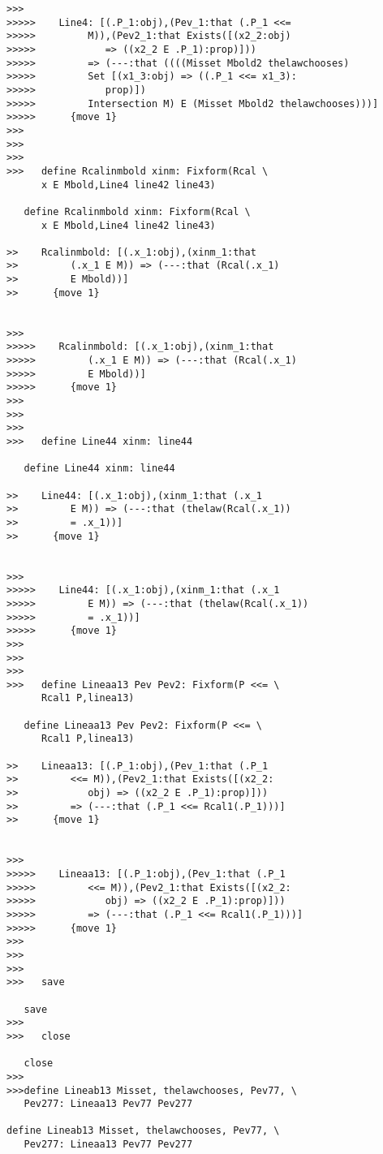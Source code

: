 \documentclass[12pt]{article}
\begin{document}
\begin{verbatim}
>>>
>>>>>    Line4: [(.P_1:obj),(Pev_1:that (.P_1 <<=
>>>>>         M)),(Pev2_1:that Exists([(x2_2:obj)
>>>>>            => ((x2_2 E .P_1):prop)]))
>>>>>         => (---:that ((((Misset Mbold2 thelawchooses)
>>>>>         Set [(x1_3:obj) => ((.P_1 <<= x1_3):
>>>>>            prop)])
>>>>>         Intersection M) E (Misset Mbold2 thelawchooses)))]
>>>>>      {move 1}
>>>
>>>
>>>
>>>   define Rcalinmbold xinm: Fixform(Rcal \
      x E Mbold,Line4 line42 line43)

   define Rcalinmbold xinm: Fixform(Rcal \
      x E Mbold,Line4 line42 line43)

>>    Rcalinmbold: [(.x_1:obj),(xinm_1:that
>>         (.x_1 E M)) => (---:that (Rcal(.x_1)
>>         E Mbold))]
>>      {move 1}


>>>
>>>>>    Rcalinmbold: [(.x_1:obj),(xinm_1:that
>>>>>         (.x_1 E M)) => (---:that (Rcal(.x_1)
>>>>>         E Mbold))]
>>>>>      {move 1}
>>>
>>>
>>>
>>>   define Line44 xinm: line44

   define Line44 xinm: line44

>>    Line44: [(.x_1:obj),(xinm_1:that (.x_1
>>         E M)) => (---:that (thelaw(Rcal(.x_1))
>>         = .x_1))]
>>      {move 1}


>>>
>>>>>    Line44: [(.x_1:obj),(xinm_1:that (.x_1
>>>>>         E M)) => (---:that (thelaw(Rcal(.x_1))
>>>>>         = .x_1))]
>>>>>      {move 1}
>>>
>>>
>>>
>>>   define Lineaa13 Pev Pev2: Fixform(P <<= \
      Rcal1 P,linea13)

   define Lineaa13 Pev Pev2: Fixform(P <<= \
      Rcal1 P,linea13)

>>    Lineaa13: [(.P_1:obj),(Pev_1:that (.P_1
>>         <<= M)),(Pev2_1:that Exists([(x2_2:
>>            obj) => ((x2_2 E .P_1):prop)]))
>>         => (---:that (.P_1 <<= Rcal1(.P_1)))]
>>      {move 1}


>>>
>>>>>    Lineaa13: [(.P_1:obj),(Pev_1:that (.P_1
>>>>>         <<= M)),(Pev2_1:that Exists([(x2_2:
>>>>>            obj) => ((x2_2 E .P_1):prop)]))
>>>>>         => (---:that (.P_1 <<= Rcal1(.P_1)))]
>>>>>      {move 1}
>>>
>>>
>>>
>>>   save

   save
>>>
>>>   close

   close
>>>
>>>define Lineab13 Misset, thelawchooses, Pev77, \
   Pev277: Lineaa13 Pev77 Pev277

define Lineab13 Misset, thelawchooses, Pev77, \
   Pev277: Lineaa13 Pev77 Pev277


\end{verbatim}
\end{document}
